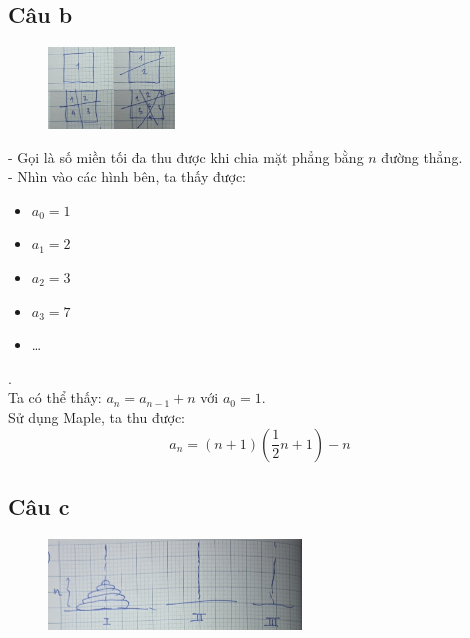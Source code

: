 \documentclass[main.tex]{subfiles}
\begin{document}
\subsection{Câu b}
\begin{figure}
\centering
\includegraphics[width=0.3\textwidth]{image/Bai1b.png}
\vspace*{-1cm}
\end{figure}
    
- Gọi  là số miền tối đa thu được khi chia mặt phẳng bằng $n$ đường thẳng.\\
- Nhìn vào các hình bên, ta thấy được: 
\begin{itemize}
    \item $a_0=1$
    \item $a_1=2$
    \item $a_2=3$
    \item $a_3=7$
    \item \dots 
\end{itemize}
.\\
Ta có thể thấy: $a_n = a_{n-1} + n$ với $a_0=1$.\\
Sử dụng Maple, ta thu được:
$$
a_n = \left(n+1\right)\left(\frac{1}{2}n+1\right)-n
$$

\subsection{Câu c}
\begin{figure}[H]
\centering
\includegraphics[width=0.6\textwidth]{image/Bai1c.png}
\end{figure}
\end{document}
